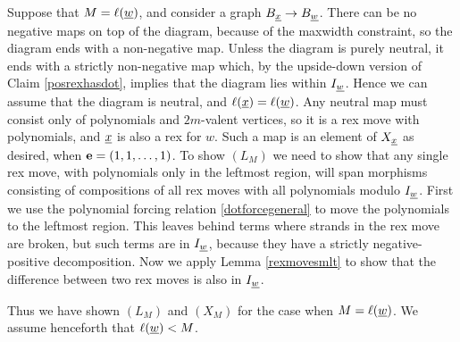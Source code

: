 Suppose that $M=\ell({\underline{w}})$, and consider a graph $B_{\underline{x}} \rightarrow B_{\underline{w}}$. There can be no negative maps on top of the diagram, because of the maxwidth constraint, so the diagram ends with a
non-negative map. Unless the diagram is purely neutral, it ends with a strictly non-negative map which, by the upside-down version of Claim \ref{posrexhasdot}, implies that the diagram
lies within $I_{\underline{w}}$. Hence we can assume that the diagram is neutral, and $\ell({\underline{x}})=\ell({\underline{w}})$. Any neutral map must consist only of polynomials and $2m$-valent vertices, so it is a rex move
with polynomials, and ${\underline{x}}$ is also a rex for $w$. Such a map is an element of $X_{\underline{x}}$ as desired, when ${\mathbf e}=(1,1,\ldots,1)$. To show $(L_M)$ we need to show that any single rex move, with
polynomials only in the leftmost region, will span morphisms consisting of compositions of all rex moves with all polynomials modulo $I_{\underline{w}}$. First we use the polynomial forcing relation \eqref{dotforcegeneral} to move the polynomials
to the leftmost region. This leaves behind terms where strands in the rex move are broken, but such terms are in $I_{\underline{w}}$, because they have a strictly negative-positive decomposition. Now
we apply Lemma \ref{rexmovesmlt} to show that the difference between two rex moves is also in $I_{\underline{w}}$.

Thus we have shown $(L_M)$ and $(X_M)$ for the case when $M=\ell({\underline{w}})$. We assume henceforth that $\ell({\underline{w}})<M$.

